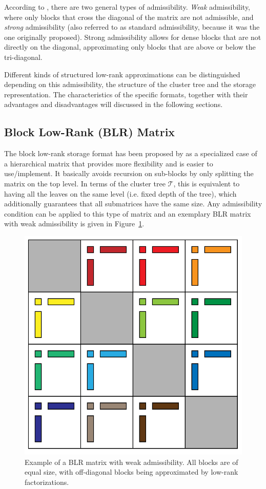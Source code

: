 \noindent According to \cite{hackbusch_hierarchical_2004}, there are two general types of admissibility. \textit{Weak} admissibility, where only blocks that cross the diagonal of the matrix are not admissible, and \textit{strong} admissibility (also referred to as standard admissibility, because it was the one originally proposed). Strong admissibility allows for dense blocks that are not directly on the diagonal, approximating only blocks that are above or below the tri-diagonal.

Different kinds of structured low-rank approximations can be distinguished depending on this admissibility, the structure of the cluster tree and the storage representation. The characteristics of the specific formats, together with their advantages and disadvantages will discussed in the following sections.

\subsection{Block Low-Rank (BLR) Matrix}
\label{sec:blr}

The block low-rank storage format has been proposed by \cite{amestoy_improving_2015} as a specialized case of a hierarchical matrix that provides more flexibility and is easier to use/implement. It basically avoids recursion on sub-blocks by only splitting the matrix on the top level. In terms of the cluster tree $\mathcal{T}$, this is equivalent to having all the leaves on the same level (i.e. fixed depth of the tree), which additionally guarantees that all submatrices have the same size. Any admissibility condition can be applied to this type of matrix and an exemplary BLR matrix with weak admissibility is given in Figure~\hyperref[fig:blr]{\ref{fig:blr}}.

\begin{figure}[h]
    \centering
    \includegraphics[width=0.6\linewidth]{chapters/4_hierarchical_matrices/figures/BLR.pdf}
    \caption[Block Low-Rank Matrix]{Example of a BLR matrix with weak admissibility. All blocks are of equal size, with off-diagonal blocks being approximated by low-rank factorizations.}
    \label{fig:blr}
\end{figure}

